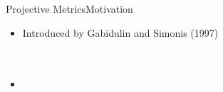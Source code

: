 
		






\begin{frame}{Projective Metrics}{Motivation}
	\vspace{-1cm}
	\begin{itemize}
		\item Introduced by Gabidulin and Simonis (1997)\\~\\ \
		\item {}
		
		
	\end{itemize}
\end{frame} 

